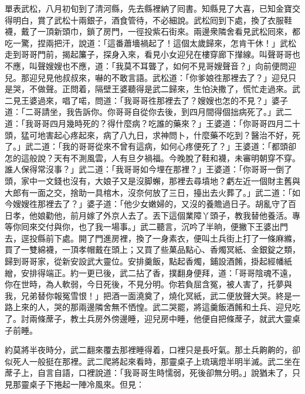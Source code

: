 單表武松，八月初旬到了清河縣，先去縣裡納了囘書。知縣見了大喜，已知金寶交得明白，賞了武松十兩銀子，酒食管待，不必細說。武松囘到下處，換了衣服鞋襪，戴了一頂新頭巾，鎖了房門，一徑投紫石街來。兩邊衆隣舍看見武松囘來，都吃一驚，捏兩把汗，說道：「這番蕭墻禍起了！這個太歲歸來，怎肯干休！」武松走到哥哥門前，揭起簾子，探身入來，看見小女迎兒在樓穿廊下攆線。叫聲哥哥也不應，叫聲嫂嫂也不應，道：「我莫不耳聾了，如何不見哥嫂聲音？」向前便問迎兒。那迎兒見他叔叔來，嚇的不敢言語。武松道：「你爹娘徃那裡去了？」迎兒只是哭，不做聲。{}正問着，隔壁王婆聽得是武二歸來，生怕決撒了，慌忙走過來。武二見王婆過來，唱了喏，問道：「我哥哥徃那裡去了？嫂嫂也怎的不見？」婆子道：「二哥請坐，我告訴你。你哥哥自從你去後，到四月間得個拙病死了。」武二道：「我哥哥四月幾時死的？得什麼病？吃誰的藥來？」王婆道：「你哥哥四月二十頭，猛可地害起心疼起來，病了八九日，求神問卜，什麼藥不吃到？{}醫治不好，死了。」武二道：「我的哥哥從來不曾有這病，如何心疼便死了？」王婆道：「都頭卻怎的這般說？天有不測風雲，人有旦夕禍福。今晚脫了鞋和襪，未審明朝穿不穿。誰人保得常沒事？」{}武二道：「我哥哥如今埋在那裡？」王婆道：「你哥哥一倒了頭，家中一文錢也沒有，大娘子又是沒脚蠏，那裡去尋墳地？虧左近一個財主舊與大郎有一面之交，捨助一具棺木，沒奈何放了三日，擡出去火葬了。」武二道：「如今嫂嫂徃那裡去了？」婆子道：「他少女嫩婦的，又沒的養贍過日子。胡亂守了百日孝，他娘勸他，前月嫁了外京人去了。丟下這個業障丫頭子，教我替他養活。{}專等你囘來交付與你，也了我一場事。」武二聽言，沉吟了半晌，{}便撇下王婆出門去，逕投縣前下處。開了門進房裡，換了一身素衣，便叫土兵街上打了一條麻縧，買了一雙綿襪，一頂孝帽戴在頭上；又買了些菓品點心、香燭冥紙、金銀錠之類，歸到哥哥家，從新安設武大靈位。安排羹飯，點起香燭，鋪設酒餚，掛起經幡紙繒，安排得端正。{}約一更已後，武二拈了香，撲翻身便拜，道：「哥哥陰魂不遠，你在世時，為人軟弱，今日死後，不見分明。你若負屈含冤，被人害了，托夢與我，兄弟替你報冤雪恨！」把酒一面澆奠了，燒化冥紙，武二便放聲大哭。{}終是一路上來的人，哭的那兩邊隣舍無不恓惶。武二哭罷，將這羹飯酒餚和土兵、迎兒吃了。討兩條蓆子，教土兵房外傍邊睡，迎兒房中睡，他便自把條蓆子，就武大靈桌子前睡。

約莫將半夜時分，武二翻來覆去那裡睡得着，口裡只是長吁氣。那土兵齁齁的，卻似死人一般挺在那裡。武二爬將起來看時，那靈桌子上琉璃燈半明半滅。武二坐在蓆子上，自言自語，口裡說道：「我哥哥生時懦弱，死後卻無分明。」說猶未了，只見那靈桌子下捲起一陣冷風來。但見：

